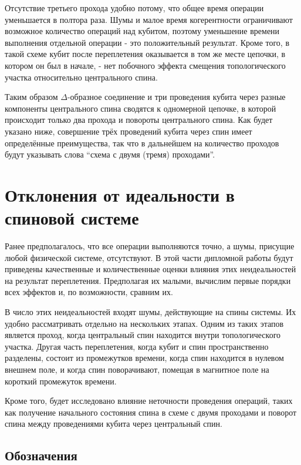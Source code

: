 \documentclass[a4paper,12pt]{article}
\theoremstyle{plain} %
\theoremstyle{definition} %
\theoremstyle{remark} %
\begin{document}
Отсутствие третьего прохода удобно потому, что общее время операции уменьшается в полтора раза. Шумы и малое время когерентности ограничивают возможное количество операций над кубитом, поэтому уменьшение времени выполнения отдельной операции - это положительный результат. Кроме того, в такой схеме кубит после переплетения оказывается в том же месте цепочки, в котором он был в начале, - нет побочного эффекта смещения топологического участка относительно центрального спина.

Таким образом $\Delta$-образное соединение и три проведения кубита через разные компоненты центрального спина сводятся к одномерной цепочке, в которой происходит только два прохода и повороты центрального спина. Как будет указано ниже, совершение трёх проведений кубита через спин имеет определённые преимущества, так что в дальнейшем на количество проходов будут указывать слова ``схема с двумя (тремя) проходами''.

\pagebreak

\section{Отклонения от идеальности в спиновой системе} \label{sec:results}

Ранее предполагалось, что все операции выполняются точно, а шумы, присущие любой физической системе, отсутствуют. В этой части дипломной работы будут приведены качественные и количественные оценки влияния этих неидеальностей на результат переплетения. Предполагая их малыми, вычислим первые порядки всех эффектов и, по возможности, сравним их.

В число этих неидеальностей входят шумы, действующие на спины системы. Их удобно рассматривать отдельно на нескольких этапах. Одним из таких этапов является проход, когда центральный спин находится внутри топологического участка. Другая часть переплетения, когда кубит и спин пространственно разделены, состоит из промежутков времени, когда спин находится в нулевом внешнем поле, и когда спин поворачивают, помещая в магнитное поле на короткий промежуток времени.

Кроме того, будет исследовано влияние неточности проведения операций, таких как получение начального состояния спина в схеме с двумя проходами и поворот спина между проведениями кубита через центральный спин.

\subsection{Обозначения}
\end{document}
